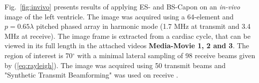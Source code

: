 \documentclass[journal]{IEEEtran}
\newcommand{\degree}{\ensuremath{^\circ}}
\newcommand\multimedia[1]{\textbf{{\color{red}#1}}}
\begin{document}


Fig.\ \ref{fig:invivo} presents results of applying ES- and BS-Capon on an \textit{in-vivo} image of the left ventricle. The image was acquired using a 64-element and $p=0.65\lambda$ pitched phased array in harmonic mode (1.7 MHz at transmit and 3.4 MHz at receive). The image frame is extracted from a cardiac cycle, that can be viewed in its full length in the attached videos \multimedia{Media-Movie 1, 2 and 3}.
The region of interest is 70\degree{} with a minimal lateral sampling of 98 receive beams given by (\ref{eq:rayleigh}).
The image was acquired using 50 transmit beams and "Synthetic Transmit Beamforming" was used on receive \cite{Hergum2007}.  %

\end{document}
